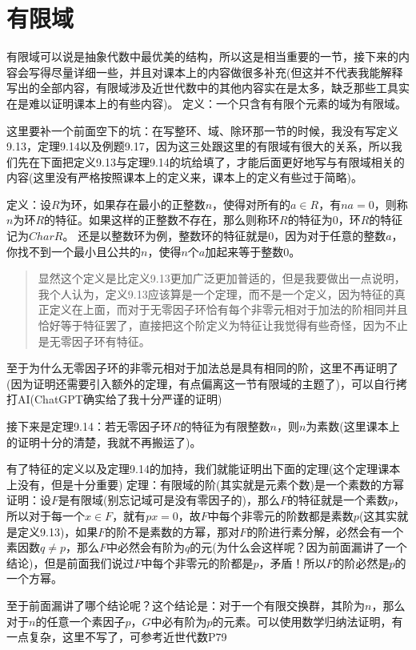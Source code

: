 \documentclass[12pt, a4paper, oneside]{ctexart}
\newenvironment{myquote}{\begin{quote}\small\color{gray}}{\end{quote}}
\begin{document}
\section{有限域}

有限域可以说是抽象代数中最优美的结构，所以这是相当重要的一节，接下来的内容会写得尽量详细一些，并且对课本上的内容做很多补充(但这并不代表我能解释写出的全部内容，有限域涉及近世代数中的其他内容实在是太多，缺乏那些工具实在是难以证明课本上的有些内容)。
定义：一个只含有有限个元素的域为有限域。

这里要补一个前面空下的坑：在写整环、域、除环那一节的时候，我没有写定义9.13，定理9.14以及例题9.17，因为这三处跟这里的有限域有很大的关系，所以我们先在下面把定义9.13与定理9.14的坑给填了，才能后面更好地写与有限域相关的内容(这里没有严格按照课本上的定义来，课本上的定义有些过于简略)。

定义：设$R$为环，如果存在最小的正整数$n$，使得对所有的$a\in R$，有$na=0$，则称$n$为环$R$的特征。如果这样的正整数不存在，那么则称环$R$的特征为0，环$R$的特征记为$Char R$。
还是以整数环为例，整数环的特征就是0，因为对于任意的整数$a$，你找不到一个最小且公共的$n$，使得$n$个$a$加起来等于整数0。

\begin{myquote}
 显然这个定义是比定义9.13更加广泛更加普适的，但是我要做出一点说明，我个人认为，定义9.13应该算是一个定理，而不是一个定义，因为特征的真正定义在上面，而对于无零因子环恰有每个非零元相对于加法的阶相同并且恰好等于特征罢了，直接把这个阶定义为特征让我觉得有些奇怪，因为不止是无零因子环有特征。
\end{myquote}

至于为什么无零因子环的非零元相对于加法总是具有相同的阶，这里不再证明了(因为证明还需要引入额外的定理，有点偏离这一节有限域的主题了)，可以自行拷打AI(ChatGPT确实给了我十分严谨的证明)

接下来是定理9.14：若无零因子环$R$的特征为有限整数$n$，则$n$为素数(这里课本上的证明十分的清楚，我就不再搬运了)。

有了特征的定义以及定理9.14的加持，我们就能证明出下面的定理(这个定理课本上没有，但是十分重要)
定理：有限域的阶(其实就是元素个数)是一个素数的方幂
证明：设$F$是有限域(别忘记域可是没有零因子的)，那么$F$的特征就是一个素数$p$，所以对于每一个$x\in F$，就有$px=0$，故$F$中每个非零元的阶数都是素数$p$(这其实就是定义9.13)，如果$F$的阶不是素数的方幂，那对$F$的阶进行素分解，必然会有一个素因数$q\neq p$，那么$F$中必然会有阶为$q$的元(为什么会这样呢？因为前面漏讲了一个结论)，但是前面我们说过$F$中每个非零元的阶都是$p$，矛盾！所以$F$的阶必然是$p$的一个方幂。

至于前面漏讲了哪个结论呢？这个结论是：对于一个有限交换群，其阶为$n$，那么对于$n$的任意一个素因子$p$，$G$中必有阶为$p$的元素。可以使用数学归纳法证明，有一点复杂，这里不写了，可参考近世代数P79
\end{document}
